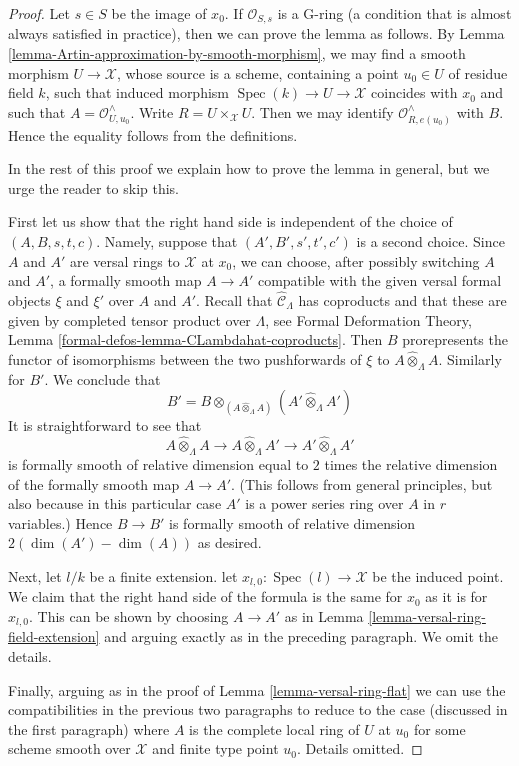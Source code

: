 \documentclass{stacks-project}
\theoremstyle{plain}
\theoremstyle{definition}
\theoremstyle{remark}
\numberwithin{equation}{subsection}
\def\Spec{\mathop{\mathrm{Spec}}}
\begin{document}
\begin{proof}
Let $s \in S$ be the image of $x_0$. If $\mathcal{O}_{S, s}$
is a G-ring (a condition that is almost always satisfied in practice),
then we can prove the lemma as follows.
By Lemma \ref{lemma-Artin-approximation-by-smooth-morphism},
we may find a smooth morphism $U \to \mathcal{X}$, whose source is a scheme,
containing a point $u_0 \in U$ of residue field $k$, such that induced
morphism $\Spec(k) \to U \to \mathcal{X}$ coincides with $x_0$
and such that $A = \mathcal{O}_{U, u_0}^\wedge$.
Write $R = U \times_\mathcal{X} U$. Then we may identify
$\mathcal{O}_{R, e(u_0)}^\wedge$ with $B$.
Hence the equality follows from the definitions.

\medskip\noindent
In the rest of this proof we explain how to prove the lemma in
general, but we urge the reader to skip this.

\medskip\noindent
First let us show that the right hand side is independent of the choice
of $(A, B, s, t, c)$. Namely, suppose that $(A', B', s', t', c')$
is a second choice. Since $A$ and $A'$ are versal rings to $\mathcal{X}$
at $x_0$, we can choose, after possibly switching $A$ and $A'$,
a formally smooth map $A \to A'$ compatible with the given versal
formal objects $\xi$ and $\xi'$ over $A$ and $A'$.
Recall that $\widehat{\mathcal{C}}_\Lambda$ has
coproducts and that these are given by completed tensor product
over $\Lambda$, see Formal Deformation Theory, Lemma
\ref{formal-defos-lemma-CLambdahat-coproducts}.
Then $B$ prorepresents the functor of isomorphisms between the
two pushforwards of $\xi$ to $A \widehat{\otimes}_\Lambda A$.
Similarly for $B'$. We conclude that
$$
B' =
B \otimes_{(A \widehat{\otimes}_\Lambda A)}
(A' \widehat{\otimes}_\Lambda A')
$$
It is straightforward to see that
$$
A \widehat{\otimes}_\Lambda A \longrightarrow
A \widehat{\otimes}_\Lambda A' \longrightarrow
A' \widehat{\otimes}_\Lambda A'
$$
is formally smooth of relative dimension equal to $2$ times the
relative dimension of the formally smooth map $A \to A'$.
(This follows from general principles, but also because
in this particular case $A'$ is a power series ring over $A$
in $r$ variables.) Hence $B \to B'$ is formally smooth of
relative dimension $2(\dim(A') - \dim(A))$ as desired.

\medskip\noindent
Next, let $l/k$ be a finite extension. let
$x_{l, 0} : \Spec(l) \to \mathcal{X}$ be
the induced point. We claim that the right hand side of the formula
is the same for $x_0$ as it is for $x_{l, 0}$.
This can be shown by choosing $A \to A'$ as in
Lemma \ref{lemma-versal-ring-field-extension}
and arguing exactly as in the preceding paragraph.
We omit the details.

\medskip\noindent
Finally, arguing as in the proof of Lemma \ref{lemma-versal-ring-flat}
we can use the compatibilities in the previous two paragraphs
to reduce to the case (discussed in the first paragraph)
where $A$ is the complete local ring of $U$ at $u_0$ for some
scheme smooth over $\mathcal{X}$ and finite type point $u_0$.
Details omitted.
\end{proof}










\end{document}
